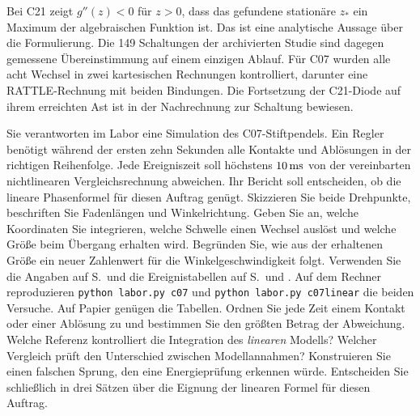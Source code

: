 Bei C21 zeigt \(g''(z)<0\) für \(z>0\), dass das gefundene stationäre \(z_*\) ein Maximum der algebraischen Funktion ist. Das ist eine analytische Aussage über die Formulierung. Die 149 Schaltungen der archivierten Studie sind dagegen gemessene Übereinstimmung auf einem einzigen Ablauf.
Für C07 wurden alle acht Wechsel in zwei kartesischen Rechnungen kontrolliert, darunter eine RATTLE-Rechnung mit beiden Bindungen. Die Fortsetzung der C21-Diode auf ihrem erreichten Ast ist in der Nachrechnung zur Schaltung bewiesen.

Sie verantworten im Labor eine Simulation des C07-Stiftpendels. Ein Regler benötigt während der ersten zehn Sekunden alle Kontakte und Ablösungen in der richtigen Reihenfolge. Jede Ereigniszeit soll höchstens \(10\,\mathrm{ms}\) von der vereinbarten nichtlinearen Vergleichsrechnung abweichen. Ihr Bericht soll entscheiden, ob die lineare Phasenformel für diesen Auftrag genügt.
Skizzieren Sie beide Drehpunkte, beschriften Sie Fadenlängen und Winkelrichtung. Geben Sie an, welche Koordinaten Sie integrieren, welche Schwelle einen Wechsel auslöst und welche Größe beim Übergang erhalten wird. Begründen Sie, wie aus der erhaltenen Größe ein neuer Zahlenwert für die Winkelgeschwindigkeit folgt.
Verwenden Sie die Angaben auf S.\, und die Ereignistabellen auf S.\, und . Auf dem Rechner reproduzieren \texttt{python labor.py c07} und \texttt{python labor.py c07linear} die beiden Versuche. Auf Papier genügen die Tabellen. Ordnen Sie jede Zeit einem Kontakt oder einer Ablösung zu und bestimmen Sie den größten Betrag der Abweichung.
Welche Referenz kontrolliert die Integration des \emph{linearen} Modells? Welcher Vergleich prüft den Unterschied zwischen Modellannahmen? Konstruieren Sie einen falschen Sprung, den eine Energieprüfung erkennen würde. Entscheiden Sie schließlich in drei Sätzen über die Eignung der linearen Formel für diesen Auftrag.

